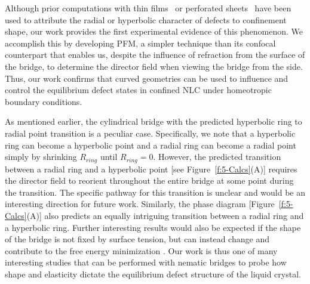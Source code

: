 Although prior computations with thin films~\cite{RN141} or perforated sheets~\cite{RN149} have been used to attribute the radial or hyperbolic character of defects to confinement shape, our work provides the first experimental evidence of this phenomenon.
We accomplish this by developing PFM, a simpler technique than its confocal counterpart that enables us, despite the influence of refraction from the surface of the bridge, to determine the director field when viewing the bridge from the side.
Thus, our work confirms that curved geometries can be used to influence and control the equilibrium defect states in confined NLC under homeotropic boundary conditions.

As mentioned earlier, the cylindrical bridge with the predicted hyperbolic ring to radial point transition is a peculiar case.
Specifically, we note that a hyperbolic ring can become a hyperbolic point and a radial ring can become a radial point simply by shrinking $R_{ring}$ until $R_{ring} = 0$.
However, the predicted transition between a radial ring and a hyperbolic point [see Figure~\ref{f:5-Calcs}(A)] requires the director field to reorient throughout the entire bridge at some point during the transition.
The specific pathway for this transition is unclear and would be an interesting direction for future work.
Similarly, the phase diagram [Figure~\ref{f:5-Calcs}(A)] also predicts an equally intriguing transition between a radial ring and a hyperbolic ring.
Further interesting results would also be expected if the shape of the bridge is not fixed by surface tension, but can instead change and contribute to the free energy minimization \cite{RN12}.
Our work is thus one of many interesting studies that can be performed with nematic bridges to probe how shape and elasticity dictate the equilibrium defect structure of the liquid crystal.
